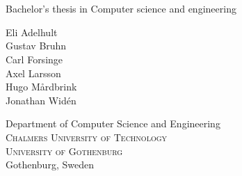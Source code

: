 
\begin{titlepage}

\addtolength{\voffset}{2cm}



\mbox{}
\vspace{3cm} %
\renewcommand{\familydefault}{\sfdefault} \normalfont %

\textbf{\Huge \multiLineTitle{0.2cm}}
\\[0.3cm]

{\Large \oneLineSubtitle}\\[0.2cm]


Bachelor's thesis in Computer science and engineering \setlength{\parskip}{1cm}

{\Large Eli Adelhult} \setlength{\parskip}{2.9cm}\\[1ex]
{\Large Gustav Bruhn} \setlength{\parskip}{2.9cm}\\[1ex]
{\Large Carl Forsinge} \setlength{\parskip}{2.9cm}\\[1ex]
{\Large Axel Larsson} \setlength{\parskip}{2.9cm}\\[1ex]
{\Large Hugo Mårdbrink} \setlength{\parskip}{2.9cm}\\[1ex]
{\Large Jonathan Widén} \setlength{\parskip}{2.9cm}

Department of Computer Science and Engineering \\
\textsc{Chalmers University of Technology} \\
\textsc{University of Gothenburg} \\
Gothenburg, Sweden \the\year

\renewcommand{\familydefault}{\rmdefault} \normalfont %
\end{titlepage}


